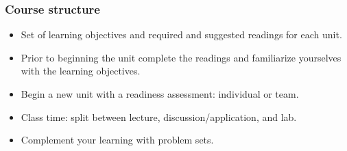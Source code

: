\documentclass[11pt]{beamer}
\begin{document}

\begin{frame}
\frametitle{Course structure}

\begin{itemize}[<alert@+>]
\item Set of learning objectives and required and suggested readings for each unit.
\item Prior to beginning the unit complete the readings and familiarize yourselves with the learning objectives. \pause
\item Begin a new unit with a readiness assessment: individual or team. \pause
\item Class time: split between lecture, discussion/application, and lab. \pause
\item Complement your learning with problem sets. \pause
\end{itemize}

\end{frame}
\end{document}
